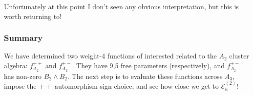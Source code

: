 \documentclass[12pt]{article}
\begin{document}
\noindent Unfortunately at this point I don't seen any obvious interpretation, but this is worth returning to!

\subsubsection*{Summary}

We have determined two weight-4 functions of interested related to the $A_2$ cluster algebra: $f_{A_2}^{++}$ and $f_{A_2}^{+-}$. They have 9,5 free parameters (respectively), and $f_{A_2}^{+-}$ has non-zero $B_2\wedge B_2$. The next step is to evaluate these functions across $A_3$, impose the $++$ automorphism sign choice, and see how close we get to $\mathcal{E}^{(2)}_6$!
\end{document}
